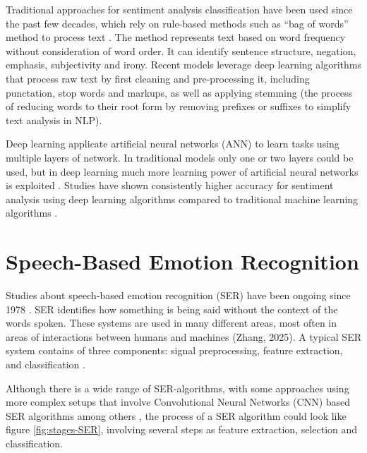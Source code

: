 Traditional approaches for sentiment analysis classification have been used since the past few decades, which rely on rule-based methods such as “bag of words” method to process text  \autocite{Kansara2020}. The method represents text based on word frequency without consideration of word order. It can identify sentence structure, negation, emphasis, subjectivity and irony. Recent models leverage deep learning algorithms that process raw text by first cleaning and pre-processing it, including punctation, stop words and markups, as well as applying stemming (the process of reducing words to their root form by removing prefixes or suffixes to simplify text analysis in NLP). 

Deep learning applicate artificial neural networks (ANN) to learn tasks using multiple layers of network. In traditional models only one or two layers could be used, but in deep learning much more learning power of artificial neural networks is exploited \autocite{Zhang2018}. Studies have shown consistently higher accuracy for sentiment analysis using deep learning algorithms compared to traditional machine learning algorithms \autocite{Kansara2020}.


\section{Speech-Based Emotion Recognition}

Studies about speech-based emotion recognition (SER) have been ongoing since 1978 \autocite{LGENSNMEZ2024}. SER identifies how something is being said without the context of the words spoken. These systems are used in many different areas, most often in areas of interactions between humans and machines (Zhang, 2025). 
A typical SER system contains of three components: signal preprocessing, feature extraction, and classification \autocite{Sahoo2023}.

Although there is a wide range of SER-algorithms, with some approaches using more complex setups that involve Convolutional Neural Networks (CNN) based SER algorithms among others \autocite{Ri2023}, the process of a SER algorithm could look like figure \ref{fig:stages-SER}, involving several steps as feature extraction, selection and classification.


